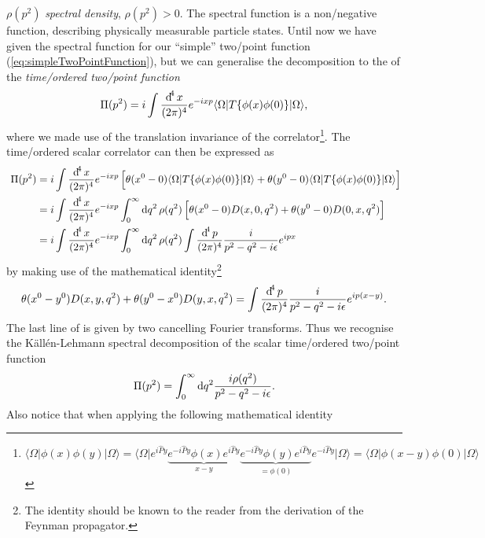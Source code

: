 \documentclass[../../index.tex]{subfiles}
\begin{document}
$\rho(p^2)$ \textit{spectral density}, $\rho(p^2) > 0$. The spectral function is
a non\-/negative function, describing physically measurable particle states.
Until now we have given the spectral function for our ``simple'' two\-/point
function (\cref{eq:simpleTwoPointFunction}), but we can generalise the
decomposition to the  of the
\textit{time\-/ordered two\-/point function}
\begin{equation}
  \Pi(p^2) = i\int\fdif{x} e^{-ixp}\langle\Omega\vert T\{\phi(x)\phi(0) \} \vert\Omega\rangle,
\end{equation}
where we made use of the translation invariance of the correlator\footnote{
  $\langle\Omega\vert\phi(x)\phi(y)\vert\Omega\rangle = \langle\Omega\vert
  e^{i\hat P y}\underbrace{e^{-i\hat P y}\phi(x)e^{i\hat P
      y}}_{x-y}\underbrace{e^{-i\hat P y}\phi(y)e^{i \hat P y}}_{=\phi(0)}e^{-i
    \hat P y} \vert\Omega\rangle =
  \langle\Omega\vert\phi(x-y)\phi(0)\vert\Omega\rangle$}. The time\-/ordered
scalar correlator can then be expressed as
\begin{equation}
  \
  \begin{split}
    \Pi(p^2)
    &= i\int\fdif{x}e^{-ixp}\left[\theta(x^0-0) \langle\Omega\vert T\{ \phi(x)\phi(0) \} \vert\Omega\rangle + \theta(y^0-0)\langle\Omega\vert T\{ \phi(x)\phi(0) \} \vert\Omega\rangle\right]  \\
    &= i\int\fdif{x}e^{-ixp}\int_0^\infty \dif q^2\, \rho(q^2) \left[ \theta(x^0-0)D(x,0,q^2) + \theta(y^0-0)D(0,x,q^2) \right] \\
    &= i\int\fdif{x}e^{-ixp}\int_0^\infty \dif q^2\, \rho(q^2) \int\fdif{p}
    \frac{i}{p^2 - q^2 - i\epsilon}e^{ipx}
  \end{split}
\end{equation}
by making use of the mathematical identity\footnote{The identity should be known
  to the reader from the derivation of the Feynman propagator.}
\begin{equation}
  \theta(x^0-y^0)D(x,y,q^2) + \theta(y^0-x^0)D(y,x,q^2) = \int \fdif{p} \frac{i}{p^2-q^2-i\epsilon}e^{ip(x-y)}.
\end{equation}
The last line of is given by two cancelling Fourier transforms. Thus we
recognise the Källén-Lehmann spectral decomposition of the scalar time\-/ordered
two\-/point function
\begin{equation}
  \Pi(p^2) = \int_0^\infty \dif q^2 \frac{i\rho(q^2)}{p^2-q^2-i\epsilon}.
\end{equation}
Also notice that when applying the following mathematical identity
\end{document}
